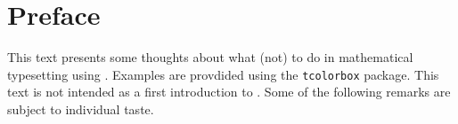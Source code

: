 \chapter{Preface}

This text presents some thoughts about what (not) to do in mathematical typesetting using .
Examples are provdided using the \texttt{tcolorbox} package.
This text is not intended as a first introduction to .
Some of the following remarks are subject to individual taste.

